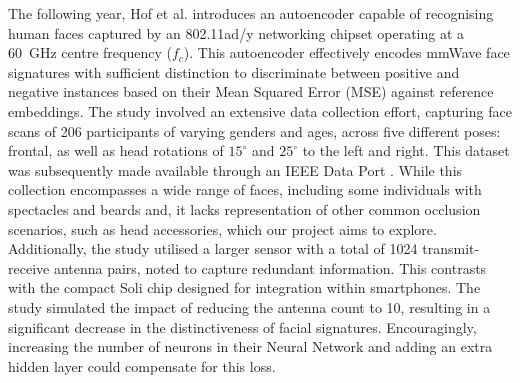 \documentclass{mpaper}
\begin{document}
The following year, Hof et al. \cite{hof2020face} introduces an autoencoder capable of recognising human faces captured by an 802.11ad/y networking chipset operating at a \qty{60}{\GHz} centre frequency ($f_c$). This autoencoder effectively encodes mmWave face signatures with sufficient distinction to discriminate between positive and negative instances based on their Mean Squared Error (MSE) against reference embeddings. The study involved an extensive data collection effort, capturing face scans of 206 participants of varying genders and ages, across five different poses: frontal, as well as head rotations of $15^\circ$ and $25^\circ$ to the left and right. This dataset was subsequently made available through an IEEE Data Port \cite{mmwavefacedata}. While this collection encompasses a wide range of faces, including some individuals with spectacles and beards and, it lacks representation of other common occlusion scenarios, such as head accessories, which our project aims to explore. Additionally, the study utilised a larger sensor with a total of 1024 transmit-receive antenna pairs, noted to capture redundant information. This contrasts with the compact Soli chip designed for integration within smartphones. The study simulated the impact of reducing the antenna count to 10, resulting in a significant decrease in the distinctiveness of facial signatures. Encouragingly, increasing the number of neurons in their Neural Network and adding an extra hidden layer could compensate for this loss.
\end{document}
